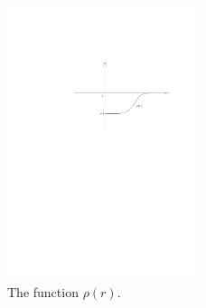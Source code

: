 \begin{figure}[htbp]
\centering
\includegraphics[width=0.5\textwidth]{pictures/Thom-iso-function}
\caption{The function $\rho(r)$.}
\label{Thom iso function rho(r)}
\end{figure}

